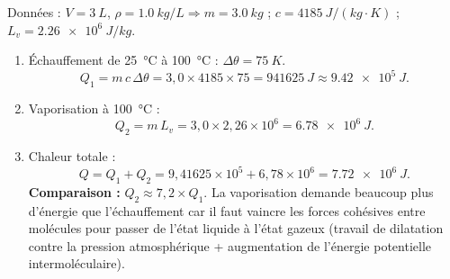 \documentclass[11pt]{article}
\begin{document}
\begin{corrige}
Données : $V = \SI{3}{L}$, $\rho = \SI{1,0}{kg/L} \Rightarrow m = \SI{3,0}{kg}$ ; $c = \SI{4185}{J/(kg\cdot K)}$ ; $L_v = \SI{2,26e6}{J/kg}$.
\begin{enumerate}
\item Échauffement de \SI{25}{\degreeCelsius} à \SI{100}{\degreeCelsius} : $\Delta\theta = \SI{75}{K}$.
  \[
  Q_1 = m\,c\,\Delta\theta = 3,0 \times 4185 \times 75 = \SI{941625}{J} \approx \SI{9,42e5}{J}.
  \]
\item Vaporisation à \SI{100}{\degreeCelsius} :
  \[
  Q_2 = m\,L_v = 3,0 \times 2,26 \times 10^6 = \SI{6,78e6}{J}.
  \]
\item Chaleur totale :
  \[
  Q = Q_1 + Q_2 = 9,41625 \times 10^5 + 6,78 \times 10^6 = \SI{7,72e6}{J}.
  \]
  \textbf{Comparaison :} $Q_2 \approx 7,2 \times Q_1$. La vaporisation demande beaucoup plus d'énergie que l'échauffement car il faut vaincre les forces cohésives entre molécules pour passer de l'état liquide à l'état gazeux (travail de dilatation contre la pression atmosphérique + augmentation de l'énergie potentielle intermoléculaire).
\end{enumerate}
\end{corrige}
\end{document}
